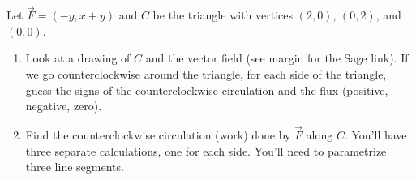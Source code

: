 \begin{problem}
%
%
Let $\vec F=(-y,x+y)$ and $C$ be the triangle with vertices $(2,0)$, $(0,2)$, and $(0,0)$.
\begin{enumerate}
\item Look at a drawing of $C$ and the vector field (see margin for the Sage link).  If we go counterclockwise around the triangle, for each side of the triangle, guess the signs of the counterclockwise circulation and the flux (positive, negative, zero).
\item Find the counterclockwise circulation (work) done by $\vec F$ along $C$.  You'll have three separate calculations, one for each side.  You'll need to parametrize three line segments.
\end{enumerate}
\end{problem}

